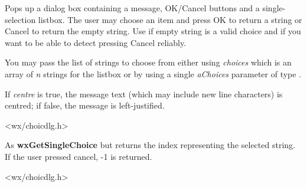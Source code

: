 Pops up a dialog box containing a message, OK/Cancel buttons and a
single-selection listbox. The user may choose an item and press OK to return a
string or Cancel to return the empty string. Use
 if empty string is a
valid choice and if you want to be able to detect pressing Cancel reliably.

You may pass the list of strings to choose from either using {\it choices}
which is an array of {\it n} strings for the listbox or by using a single
{\it aChoices} parameter of type .

If {\it centre} is true, the message text (which may include new line
characters) is centred; if false, the message is left-justified.


<wx/choicdlg.h>



\label{wxgetsinglechoiceindex}



As {\bf wxGetSingleChoice} but returns the index representing the selected
string. If the user pressed cancel, -1 is returned.


<wx/choicdlg.h>




